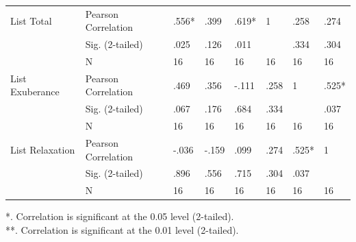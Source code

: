 \begin{landscape}
\begin{table}[hbtp!]
\begin{tabular}{|l|l|m{1.8cm}p{2.5cm}p{2cm}m{1.8cm}p{2.5cm}p{2cm}|}
List Total                                           & Pearson Correlation & .556*            & .399           & .619*          & 1                 & .258            & .274            \\
                                                            & Sig. (2-tailed)     & .025             & .126           & .011           &                   & .334            & .304            \\
                                                            & N                   & 16               & 16             & 16             & 16                & 16              & 16              \\
List Exuberance                                             & Pearson Correlation & .469             & .356           & -.111          & .258              & 1               & .525*           \\
                                                            & Sig. (2-tailed)     & .067             & .176           & .684           & .334              &                 & .037            \\
                                                            & N                   & 16               & 16             & 16             & 16                & 16              & 16              \\
List Relaxation                                             & Pearson Correlation & -.036            & -.159          & .099           & .274              & .525*           & 1               \\
                                                            & Sig. (2-tailed)     & .896             & .556           & .715           & .304              & .037            &                 \\
                                                            & N                   & 16               & 16             & 16             & 16                & 16              & 16              \\ \hline            
\end{tabular}\end{table}
*. Correlation is significant at the 0.05 level (2-tailed). \\	
**. Correlation is significant at the 0.01 level (2-tailed).
\clearpage

\end{landscape}


